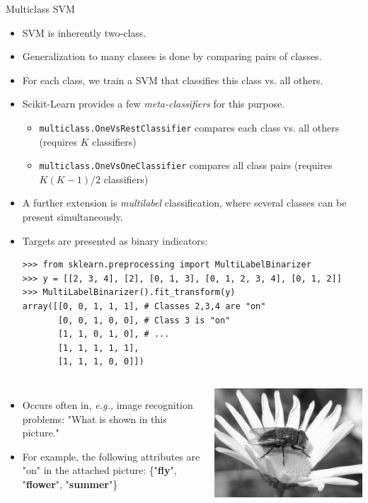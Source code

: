 \documentclass[10pt, aspectratio=169]{beamer} %
\begin{document}
\begin{frame}[fragile,allowframebreaks=0.8]
{Multiclass SVM}
\begin{itemize}
\item SVM is inherently two-class.
\item Generalization to many classes is done by comparing pairs of classes.
\item For each class, we train a SVM that classifies this class vs. all others.
\item Scikit-Learn provides a few \textit{meta-classifiers} for this purpose.
\begin{itemize}
\item \verb+multiclass.OneVsRestClassifier+ compares each class vs. all others (requires $K$ classifiers)
\item \verb+multiclass.OneVsOneClassifier+ compares all class pairs (requires $K(K-1) / 2$ classifiers)
\end{itemize}
\eject
\item A further extension is \emph{multilabel} classification, where several classes can be
present simultaneously.
\item Targets are presented as binary indicators: 
\begin{lstlisting}
>>> from sklearn.preprocessing import MultiLabelBinarizer
>>> y = [[2, 3, 4], [2], [0, 1, 3], [0, 1, 2, 3, 4], [0, 1, 2]]
>>> MultiLabelBinarizer().fit_transform(y)
array([[0, 0, 1, 1, 1], # Classes 2,3,4 are "on"
       [0, 0, 1, 0, 0], # Class 3 is "on"
       [1, 1, 0, 1, 0], # ...
       [1, 1, 1, 1, 1],
       [1, 1, 1, 0, 0]])
\end{lstlisting}
\end{itemize}
\begin{columns}
\begin{itemize}
\item Occurs often in, \emph{e.g.,} image recognition problems: "What is shown in this picture."
\item For example, the following attributes are "on" in the attached picture:
\{"\textbf{fly}", "\textbf{flower}", "\textbf{summer}"\}
\end{itemize}
\includegraphics[width=\columnwidth]{karpanen.png}
\end{columns}
\end{frame}
\end{document}
